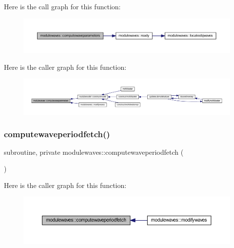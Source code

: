 Here is the call graph for this function\+:\nopagebreak
\begin{figure}[H]
\begin{center}
\leavevmode
\includegraphics[width=350pt]{namespacemodulewaves_a6a63e2ee3bdd7ee4378a33408a4668a7_cgraph}
\end{center}
\end{figure}
Here is the caller graph for this function\+:\nopagebreak
\begin{figure}[H]
\begin{center}
\leavevmode
\includegraphics[width=350pt]{namespacemodulewaves_a6a63e2ee3bdd7ee4378a33408a4668a7_icgraph}
\end{center}
\end{figure}
\mbox{\label{namespacemodulewaves_abd3acb5aa4305dcf02b29e94c10a666f}} 
\subsubsection{\texorpdfstring{computewaveperiodfetch()}{computewaveperiodfetch()}}
{\footnotesize\ttfamily subroutine, private modulewaves\+::computewaveperiodfetch (\begin{DoxyParamCaption}{ }\end{DoxyParamCaption})\hspace{0.3cm}{\ttfamily [private]}}

Here is the caller graph for this function\+:\nopagebreak
\begin{figure}[H]
\begin{center}
\leavevmode
\includegraphics[width=350pt]{namespacemodulewaves_abd3acb5aa4305dcf02b29e94c10a666f_icgraph}
\end{center}
\end{figure}
\mbox{\label{namespacemodulewaves_a8fac90eb88cf4a39a40d63dbc040c2fa}} 
